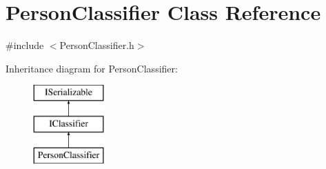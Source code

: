 \hypertarget{class_person_classifier}{}\section{Person\+Classifier Class Reference}
\label{class_person_classifier}


{\ttfamily \#include $<$Person\+Classifier.\+h$>$}

Inheritance diagram for Person\+Classifier\+:\begin{figure}[H]
\begin{center}
\leavevmode
\includegraphics[height=3.000000cm]{class_person_classifier}
\end{center}
\end{figure}
